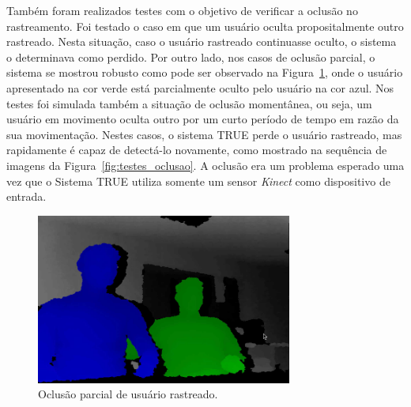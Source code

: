 	Também foram realizados testes com o objetivo de verificar a oclusão no
	rastreamento. Foi testado o caso em que um usuário oculta propositalmente outro
	rastreado. Nesta situação, caso o usuário rastreado continuasse oculto, o
	sistema o determinava como perdido. Por outro lado, nos casos de oclusão
	parcial, o sistema se mostrou robusto como pode ser observado na
	Figura~\ref{fig:testes_oclusao_sucesso}, onde o usuário apresentado na cor verde
	está parcialmente oculto pelo usuário na cor azul. Nos testes foi simulada
	também a situação de oclusão momentânea, ou seja, um usuário em movimento oculta
	outro por um curto período de tempo em razão da sua movimentação. Nestes casos,
	o sistema TRUE perde o usuário rastreado, mas rapidamente é capaz de detectá-lo
	novamente, como mostrado na sequência de imagens da
	Figura~\ref{fig:testes_oclusao}. A oclusão era um problema esperado uma vez que
	o Sistema TRUE utiliza somente um sensor \textit{Kinect} como dispositivo de
	entrada.
			
	\begin{figure}[htb]
		\begin{center}
			\includegraphics[width=0.75\textwidth]{figuras/5.Testes/oclusao/oclusao_corretamente.png}
		\end{center}
		\caption{Oclusão parcial de usuário rastreado.}
		\label{fig:testes_oclusao_sucesso}
	\end{figure}

